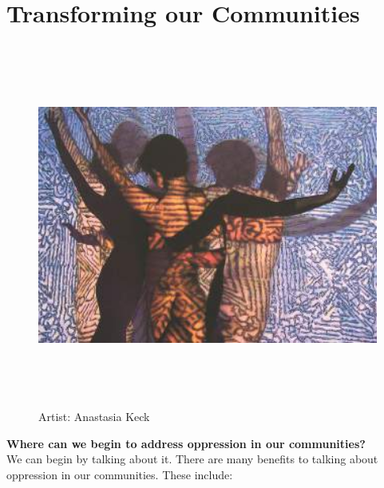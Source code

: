 \chapter{Transforming our Communities}


\begin{figure}[h]
	\centering
	\includegraphics[height=12cm]{TeX_files/4-0.png}
	\caption{Artist: Anastasia Keck}
	\label{2-0}
\end{figure}

\noindent\textcolor{ProcessBlue}{\textbf{\LARGE{Where can we begin to address oppression in our communities?}}}\\

We can begin by talking about it. There are many benefits to talking about
oppression in our communities. These include:

